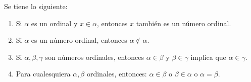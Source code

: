 \documentclass[12pt]{report}
\newcounter{it}
\theoremstyle{largebreak}
\begin{document}
    \begin{theor}
        Se tiene lo siguiente:
        \begin{enumerate}[label = \textit{(\arabic*)}]
            \item Si $\alpha$ es un ordinal y $x\in\alpha$, entonces $x$ también es un número ordinal.
            \item Si $\alpha$ es un número ordinal, entonces $\alpha\notin\alpha$.
            \item Si $\alpha,\beta,\gamma$ son números ordinales, entonces $\alpha\in\beta$ y $\beta\in\gamma$ implica que $\alpha\in\gamma$.
            \item Para cualesquiera $\alpha,\beta$ ordinales, entonces: $\alpha\in\beta$ o $\beta\in\alpha$ o $\alpha=\beta$.
        \end{enumerate}
    \end{theor}
\end{document}
